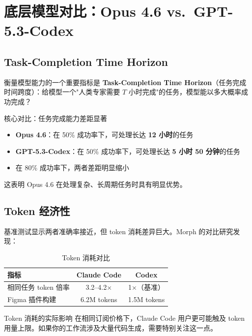 \documentclass[a4paper]{article}
\begin{document}
\section{底层模型对比：Opus 4.6 vs.\ GPT-5.3-Codex}

\subsection{Task-Completion Time Horizon}

衡量模型能力的一个重要指标是 \textbf{Task-Completion Time Horizon}（任务完成时间跨度）：给模型一个"人类专家需要 $T$ 小时完成"的任务，模型能以多大概率成功完成？

\begin{importantbox}{核心对比：任务完成能力差距显著}
\begin{itemize}
    \item \textbf{Opus 4.6}：在 50\% 成功率下，可处理长达 \textbf{12 小时}的任务
    \item \textbf{GPT-5.3-Codex}：在 50\% 成功率下，可处理长达 \textbf{5 小时 50 分钟}的任务
    \item 在 80\% 成功率下，两者差距明显缩小
\end{itemize}
这表明 Opus 4.6 在处理复杂、长周期任务时具有明显优势。
\end{importantbox}

\subsection{Token 经济性}

基准测试显示两者准确率接近，但 token 消耗差异巨大。Morph 的对比研究发现：

\begin{table}[H]
\centering
\caption{Token 消耗对比}
\begin{tabular}{lcc}
\toprule
\textbf{指标} & \textbf{Claude Code} & \textbf{Codex} \\
\midrule
相同任务 token 倍率 & 3.2--4.2$\times$ & 1$\times$（基准） \\
Figma 插件构建 & 6.2M tokens & 1.5M tokens \\
\bottomrule
\end{tabular}
\end{table}

\begin{warningbox}{Token 消耗的实际影响}
在相同订阅价格下，Claude Code 用户更可能触及 token 用量上限。如果你的工作流涉及大量代码生成，需要特别关注这一点。
\end{warningbox}
\end{document}
